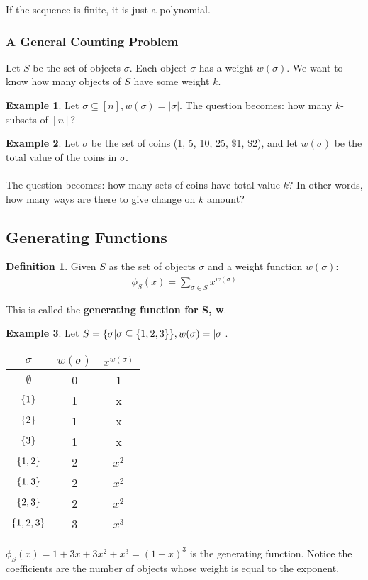 \documentclass[]{article}
\theoremstyle{definition}
\newtheorem*{defn}{Definition}
\newtheorem{ex}{Example}[section]
\DeclarePairedDelimiter{\set}{\lbrace}{\rbrace}
\begin{document}
			If the sequence is finite, it is just a polynomial.
			
			\subsubsection{A General Counting Problem}
				Let $S$ be the set of objects $\sigma$. Each object $\sigma$ has a weight $w(\sigma)$. We want to know how many objects of $S$ have some weight $k$.
				
				\begin{ex}
					Let $\sigma \subseteq [n], w(\sigma) = |\sigma|$. The question becomes: how many $k$-subsets of $[n]$?
				\end{ex}
				
				\begin{ex}
					Let $\sigma$ be the set of coins (1\cent, 5\cent, 10\cent, 25\cent, \$1, \$2), and let $w(\sigma)$ be the total value of the coins in $\sigma$.
					\\ \\
					The question becomes: how many sets of coins have total value $k$? In other words, how many ways are there to give change on $k$ amount?
				\end{ex}
		\subsection{Generating Functions}
			\begin{defn}
				Given $S$ as the set of objects $\sigma$ and a weight function $w(\sigma)$:
				\begin{align*}
					\phi_S(x) = \sum_{\sigma \in S} x^{w(\sigma)}
				\end{align*}
				
				This is called the \textbf{generating function for S, w}.
			\end{defn}
			
			\begin{ex}
				Let $S = \set{\sigma | \sigma \subseteq \set{1, 2, 3} }, w(\sigma) = |\sigma|$.
				
				\begin{center}
					\begin{tabular}{c|c|c}
						$\sigma$ & $w(\sigma)$ & $x^{w(\sigma)}$ \\ \hline
						$\emptyset$ & 0 & 1 \\
						$\set{1}$ & 1 & x \\
						$\set{2}$ & 1 & x \\
						$\set{3}$ & 1 & x \\
						$\set{1, 2}$ & 2 & $x^2$ \\
						$\set{1, 3}$ & 2 & $x^2$ \\
						$\set{2, 3}$ & 2 & $x^2$ \\
						$\set{1, 2, 3}$ & 3 & $x^3$ \\
					\end{tabular}
				\end{center}
				
				$\phi_S(x) = 1 + 3x + 3x^2 + x^3 = (1 + x)^3$ is the generating function. Notice the coefficients are the number of objects whose weight is equal to the exponent.
			\end{ex}
			
\end{document}
